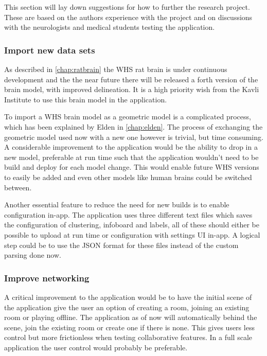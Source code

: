 







This section will lay down suggestions for how to further the research project. These are based on the authors experience with the project and on discussions with the neurologists and medical students testing the application. 

\subsubsection*{Import new data sets}

As described in \autoref{chap:ratbrain} the WHS rat brain is under continuous development and the the near future there will be released a forth version of the brain model, with improved delineation. It is a high priority wish from the Kavli Institute to use this brain model in the application.

To import a WHS brain model as a geometric model is a complicated process, which has been explained by Elden in \autoref{chap:elden}.
The process of exchanging the geometric model used now with a new one however is trivial, but time consuming. A considerable improvement to the application would be the ability to drop in a new model, preferable at run time such that the application wouldn't need to be build and deploy for each model change.
This would enable future WHS versions to easily be added and even other models like human brains could be switched between.  

Another essential feature to reduce the need for new builds is to enable configuration in-app. The application uses three different text files which saves the configuration of clustering, infoboard and labels, all of these should either be possible to upload at run time or configuration with settings UI in-app. A logical step could be to use the JSON format for these files instead of the custom parsing done now.

\subsubsection*{Improve networking}
A critical improvement to the application would be to have the initial scene of the application give the user an option of creating a room, joining an existing room or playing offline.
The application as of now will automatically behind the scene, join the existing room or create one if there is none. This gives users less control but more frictionless when testing collaborative features. In a full scale application the user control would probably be preferable.

